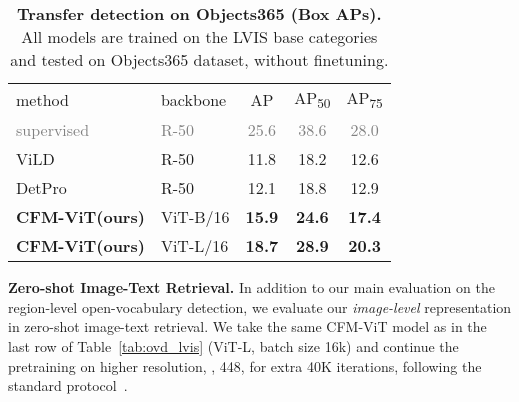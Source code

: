 \documentclass[10pt,twocolumn,letterpaper]{article}
\newcommand{\gray}[1]{\textcolor{gray}{{#1}}}
\newcommand{\tabref}[1]{Table~\ref{#1}}
\renewcommand{\paragraph}[1]{\vspace{1mm}\noindent\textbf{#1}}
\newcommand{\tablestyle}[2]{\setlength{\tabcolsep}{#1}\renewcommand{\arraystretch}{#2}\centering\footnotesize}
\newcommand{\ours}{CFM-ViT\xspace}
\begin{document}
\begin{table}[t]
\centering
\small
\tablestyle{8pt}{1.1}
\begin{tabular}{ll|ccc}
method              & backbone  & AP    & AP\textsubscript{50}  & AP\textsubscript{75}    \\
\shline
\gray{supervised~\cite{gu2022openvocabulary}} & \gray{R-50} & \gray{25.6} & \gray{38.6} & \gray{28.0}  \\
ViLD~\cite{gu2022openvocabulary}   & R-50      & 11.8      & 18.2      & 12.6  \\
DetPro~\cite{du2022learning}       & R-50      & 12.1      & 18.8      & 12.9  \\
\hline
\bf{\ours (ours)}   & ViT-B/16  & \bf{15.9}    & \bf{24.6}    & \bf{17.4} \\
\bf{\ours (ours)}   & ViT-L/16  & \bf{18.7}    & \bf{28.9}    & \bf{20.3} \\
\end{tabular}
\caption{\textbf{Transfer detection on Objects365 (Box APs).} All models are trained on the LVIS base categories and tested on Objects365 dataset, without finetuning.}
\label{tab:transfer}
\vspace{-2mm}
\end{table}


\paragraph{Zero-shot Image-Text Retrieval.} \label{sec:retrieval}
In addition to our main evaluation on the region-level open-vocabulary detection, we evaluate our \textit{image-level} representation in zero-shot image-text retrieval. We take the same \ours model as in the last row of \tabref{tab:ovd_lvis} (ViT-L, batch size 16k) and continue the pretraining on higher resolution, \eg, 448, for extra 40K iterations, following the standard protocol~\cite{align,yu2022coca}.
\end{document}
